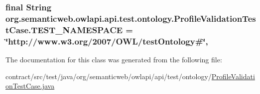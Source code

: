 \hypertarget{classorg_1_1semanticweb_1_1owlapi_1_1api_1_1test_1_1ontology_1_1_profile_validation_test_case_a04eaa9905dbac33bf9d2784b8f2993a3}{
\subsubsection[{T\-E\-S\-T\-\_\-\-N\-A\-M\-E\-S\-P\-A\-C\-E}]{\setlength{\rightskip}{0pt plus 5cm}final String org.\-semanticweb.\-owlapi.\-api.\-test.\-ontology.\-Profile\-Validation\-Test\-Case.\-T\-E\-S\-T\-\_\-\-N\-A\-M\-E\-S\-P\-A\-C\-E = \char`\"{}http\-://www.\-w3.\-org/2007/O\-W\-L/test\-Ontology\#\char`\"{}\hspace{0.3cm}{\ttfamily [static]}, {\ttfamily [private]}}}\label{classorg_1_1semanticweb_1_1owlapi_1_1api_1_1test_1_1ontology_1_1_profile_validation_test_case_a04eaa9905dbac33bf9d2784b8f2993a3}


The documentation for this class was generated from the following file\-:\begin{DoxyCompactItemize}
\item 
contract/src/test/java/org/semanticweb/owlapi/api/test/ontology/\hyperlink{_profile_validation_test_case_8java}{Profile\-Validation\-Test\-Case.\-java}\end{DoxyCompactItemize}
